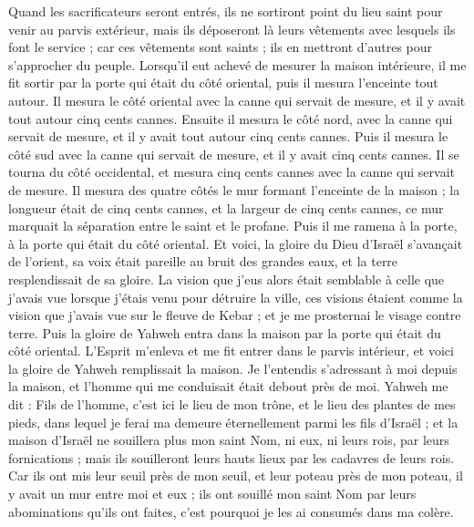 \begin{multicols}{2}
Quand les sacrificateurs seront entrés, ils ne sortiront point du lieu saint pour venir au parvis extérieur, mais ils déposeront là leurs vêtements avec lesquels ils font le service ; car ces vêtements sont saints ; ils en mettront d'autres pour s'approcher du peuple.
Lorsqu'il eut achevé de mesurer la maison intérieure, il me fit sortir par la porte qui était du côté oriental, puis il mesura l'enceinte tout autour.
Il mesura le côté oriental avec la canne qui servait de mesure, et il y avait tout autour cinq cents cannes.
Ensuite il mesura le côté nord, avec la canne qui servait de mesure, et il y avait tout autour cinq cents cannes.
Puis il mesura le côté sud avec la canne qui servait de mesure, et il y avait cinq cents cannes.
Il se tourna du côté occidental, et mesura cinq cents cannes avec la canne qui servait de mesure.
Il mesura des quatre côtés le mur formant l'enceinte de la maison ; la longueur était de cinq cents cannes, et la largeur de cinq cents cannes, ce mur marquait la séparation entre le saint et le profane.
\VerseOne{}Puis il me ramena à la porte, à la porte qui était du côté oriental.
Et voici, la gloire du Dieu d'Israël s'avançait de l'orient, sa voix était pareille au bruit des grandes eaux, et la terre resplendissait de sa gloire.
La vision que j'eus alors était semblable à celle que j'avais vue lorsque j'étais venu pour détruire la ville, ces visions étaient comme la vision que j'avais vue sur le fleuve de Kebar ; et je me prosternai le visage contre terre.
Puis la gloire de Yahweh entra dans la maison par la porte qui était du côté oriental.
L'Esprit m'enleva et me fit entrer dans le parvis intérieur, et voici la gloire de Yahweh remplissait la maison.
Je l'entendis s'adressant à moi depuis la maison, et l'homme qui me conduisait était debout près de moi.
Yahweh me dit : Fils de l'homme, c'est ici le lieu de mon trône, et le lieu des plantes de mes pieds, dans lequel je ferai ma demeure éternellement parmi les fils d'Israël ; et la maison d'Israël ne souillera plus mon saint Nom, ni eux, ni leurs rois, par leurs fornications ; mais ils souilleront leurs hauts lieux par les cadavres de leurs rois.
Car ils ont mis leur seuil près de mon seuil, et leur poteau près de mon poteau, il y avait un mur entre moi et eux ; ils ont souillé mon saint Nom par leurs abominations qu'ils ont faites, c'est pourquoi je les ai consumés dans ma colère.

\end{multicols}
